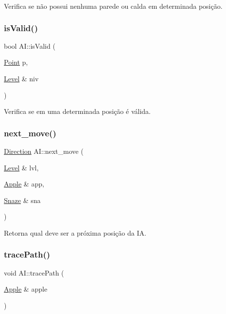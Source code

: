 Verifica se não possui nenhuma parede ou calda em determinada posição. 

\mbox{\label{classAI_a1680ae2c44e5cb60bf0c4f9e50892e46}} 
\subsubsection{\texorpdfstring{is\+Valid()}{isValid()}}
{\footnotesize\ttfamily bool A\+I\+::is\+Valid (\begin{DoxyParamCaption}\item[{\hyperlink{structPoint}{Point}}]{p,  }\item[{\hyperlink{classLevel}{Level} \&}]{niv }\end{DoxyParamCaption})\hspace{0.3cm}{\ttfamily [private]}}



Verifica se em uma determinada posição é válida. 

\mbox{\label{classAI_a53dddd1401e27e826362de53d82b3f50}} 
\subsubsection{\texorpdfstring{next\+\_\+move()}{next\_move()}}
{\footnotesize\ttfamily \hyperlink{game__classes_8hpp_a224b9163917ac32fc95a60d8c1eec3aa}{Direction} A\+I\+::next\+\_\+move (\begin{DoxyParamCaption}\item[{\hyperlink{classLevel}{Level} \&}]{lvl,  }\item[{\hyperlink{classApple}{Apple} \&}]{app,  }\item[{\hyperlink{classSnaze}{Snaze} \&}]{sna }\end{DoxyParamCaption})}



Retorna qual deve ser a próxima posição da IA. 

\mbox{\label{classAI_a4cba0636ec1133d67a7cb77284beebe5}} 
\subsubsection{\texorpdfstring{trace\+Path()}{tracePath()}}
{\footnotesize\ttfamily void A\+I\+::trace\+Path (\begin{DoxyParamCaption}\item[{\hyperlink{classApple}{Apple} \&}]{apple }\end{DoxyParamCaption})\hspace{0.3cm}{\ttfamily [private]}}




